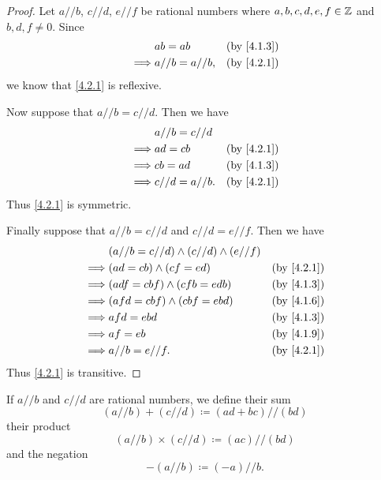 \begin{proof}
  Let \(a // b\), \(c // d\), \(e // f\) be rational numbers where \(a, b, c, d, e, f \in \mathbb{Z}\) and \(b, d, f \neq 0\).
  Since
  \begin{align*}
             & ab = ab          & \text{(by \cref{4.1.3})} \\
    \implies & a // b = a // b, & \text{(by \cref{4.2.1})}
  \end{align*}
  we know that \cref{4.2.1} is reflexive.

  Now suppose that \(a // b = c // d\).
  Then we have
  \begin{align*}
             & a // b = c // d                             \\
    \implies & ad = cb          & \text{(by \cref{4.2.1})} \\
    \implies & cb = ad          & \text{(by \cref{4.1.3})} \\
    \implies & c // d = a // b. & \text{(by \cref{4.2.1})}
  \end{align*}
  Thus \cref{4.2.1} is symmetric.

  Finally suppose that \(a // b = c // d\) and \(c // d = e // f\).
  Then we have
  \begin{align*}
             & (a // b = c // d) \land (c // d) \land (e // f)                            \\
    \implies & (ad = cb) \land (cf = ed)                       & \text{(by \cref{4.2.1})} \\
    \implies & (adf = cbf) \land (cfb = edb)                   & \text{(by \cref{4.1.3})} \\
    \implies & (afd = cbf) \land (cbf = ebd)                   & \text{(by \cref{4.1.6})} \\
    \implies & afd = ebd                                       & \text{(by \cref{4.1.3})} \\
    \implies & af = eb                                         & \text{(by \cref{4.1.9})} \\
    \implies & a // b = e // f.                                & \text{(by \cref{4.2.1})}
  \end{align*}
  Thus \cref{4.2.1} is transitive.
\end{proof}

\begin{defn}\label{4.2.2}
  If \(a // b\) and \(c // d\) are rational numbers, we define their sum
  \[
    (a // b) + (c // d) \coloneqq (ad + bc) // (bd)
  \]
  their product
  \[
    (a // b) \times (c // d) \coloneqq (ac) // (bd)
  \]
  and the negation
  \[
    -(a // b) \coloneqq (-a) // b.
  \]
\end{defn}

